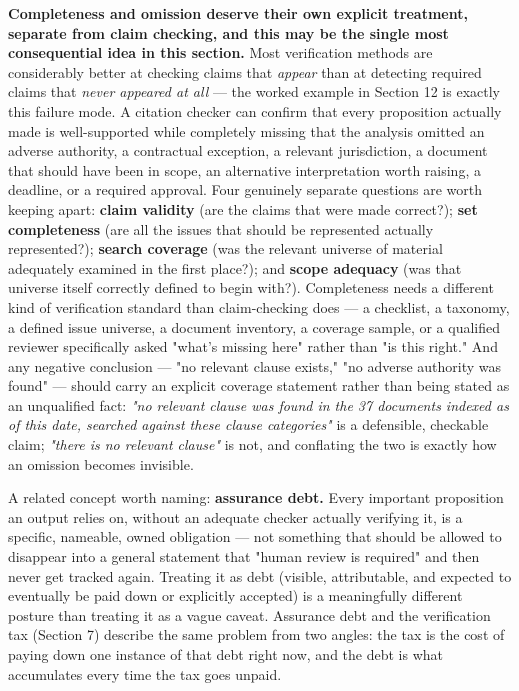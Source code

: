 \textbf{Completeness and omission deserve their own explicit treatment, separate from claim checking, and this may be the single most consequential idea in this section.} Most verification methods are considerably better at checking claims that \emph{appear} than at detecting required claims that \emph{never appeared at all} --- the worked example in Section 12 is exactly this failure mode. A citation checker can confirm that every proposition actually made is well-supported while completely missing that the analysis omitted an adverse authority, a contractual exception, a relevant jurisdiction, a document that should have been in scope, an alternative interpretation worth raising, a deadline, or a required approval. Four genuinely separate questions are worth keeping apart: \textbf{claim validity} (are the claims that were made correct?); \textbf{set completeness} (are all the issues that should be represented actually represented?); \textbf{search coverage} (was the relevant universe of material adequately examined in the first place?); and \textbf{scope adequacy} (was that universe itself correctly defined to begin with?). Completeness needs a different kind of verification standard than claim-checking does --- a checklist, a taxonomy, a defined issue universe, a document inventory, a coverage sample, or a qualified reviewer specifically asked "what's missing here" rather than "is this right." And any negative conclusion --- "no relevant clause exists," "no adverse authority was found" --- should carry an explicit coverage statement rather than being stated as an unqualified fact: \emph{"no relevant clause was found in the 37 documents indexed as of this date, searched against these clause categories"} is a defensible, checkable claim; \emph{"there is no relevant clause"} is not, and conflating the two is exactly how an omission becomes invisible.

A related concept worth naming: \textbf{assurance debt.} Every important proposition an output relies on, without an adequate checker actually verifying it, is a specific, nameable, owned obligation --- not something that should be allowed to disappear into a general statement that "human review is required" and then never get tracked again. Treating it as debt (visible, attributable, and expected to eventually be paid down or explicitly accepted) is a meaningfully different posture than treating it as a vague caveat. Assurance debt and the verification tax (Section 7) describe the same problem from two angles: the tax is the cost of paying down one instance of that debt right now, and the debt is what accumulates every time the tax goes unpaid.


